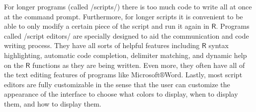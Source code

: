 For longer programs (called /scripts/) there is too much code to write
all at once at the command prompt. Furthermore, for longer scripts it
is convenient to be able to only modify a certain piece of the script
and run it again in \(\mathsf{R}\). Programs called /script editors/
are specially designed to aid the communication and code writing
process. They have all sorts of helpful features including
\(\mathsf{R}\) syntax highlighting, automatic code completion,
delimiter matching, and dynamic help on the \(\mathsf{R}\) functions
as they are being written. Even more, they often have all of the text
editing features of programs like Microsoft\(\circledR\)Word. Lastly,
most script editors are fully customizable in the sense that the user
can customize the appearance of the interface to choose what colors to
display, when to display them, and how to display them.

